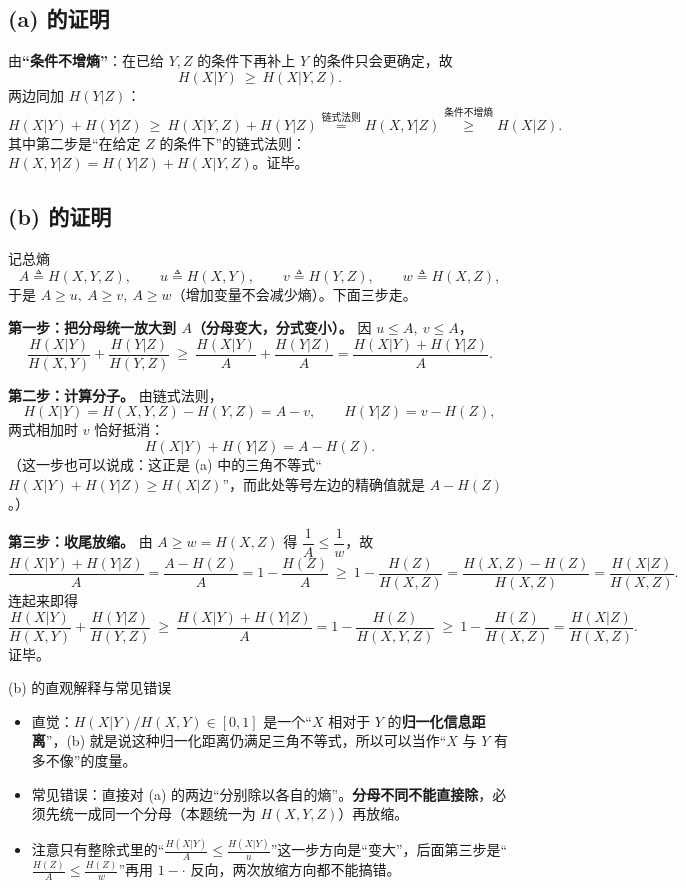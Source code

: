 \documentclass[11pt,a4paper]{ctexart}
\newcommand{\Hx}[1]{H\!\left(#1\right)}
\begin{document}
\subsection*{(a) 的证明}
由\textbf{“条件不增熵”}：在已给 $Y,Z$ 的条件下再补上 $Y$ 的条件只会更确定，故
\[
\Hx{X|Y}\ \ge\ \Hx{X|Y,Z}.
\]
两边同加 $\Hx{Y|Z}$：
\[
\Hx{X|Y}+\Hx{Y|Z}\ \ge\ \Hx{X|Y,Z}+\Hx{Y|Z}
\overset{\text{链式法则}}{=}\Hx{X,Y|Z}
\overset{\text{条件不增熵}}{\ge}\Hx{X|Z}.
\]
其中第二步是“在给定 $Z$ 的条件下”的链式法则：
$\Hx{X,Y|Z}=\Hx{Y|Z}+\Hx{X|Y,Z}$。证毕。

\subsection*{(b) 的证明}
记总熵
\[
A\triangleq \Hx{X,Y,Z},\qquad u\triangleq\Hx{X,Y},\qquad v\triangleq\Hx{Y,Z},\qquad w\triangleq\Hx{X,Z},
\]
于是 $A\ge u,\ A\ge v,\ A\ge w$（增加变量不会减少熵）。下面三步走。

\textbf{第一步：把分母统一放大到 $A$（分母变大，分式变小）。} 因 $u\le A,\ v\le A$，
\[
\frac{\Hx{X|Y}}{\Hx{X,Y}}+\frac{\Hx{Y|Z}}{\Hx{Y,Z}}
\ \ge\ \frac{\Hx{X|Y}}{A}+\frac{\Hx{Y|Z}}{A}
=\frac{\Hx{X|Y}+\Hx{Y|Z}}{A}.
\]

\textbf{第二步：计算分子。} 由链式法则，
\[
\Hx{X|Y}=\Hx{X,Y,Z}-\Hx{Y,Z}=A-v,\qquad
\Hx{Y|Z}=v-H(Z),
\]
两式相加时 $v$ 恰好抵消：
\[
\Hx{X|Y}+\Hx{Y|Z}=A-H(Z).
\]
（这一步也可以说成：这正是 (a) 中的三角不等式“$\Hx{X|Y}+\Hx{Y|Z}\ge \Hx{X|Z}$”，而此处等号左边的精确值就是 $A-H(Z)$。）

\textbf{第三步：收尾放缩。} 由 $A\ge w=\Hx{X,Z}$ 得 $\dfrac{1}{A}\le\dfrac{1}{w}$，故
\[
\frac{\Hx{X|Y}+\Hx{Y|Z}}{A}=\frac{A-H(Z)}{A}=1-\frac{H(Z)}{A}
\ \ge\ 1-\frac{H(Z)}{\Hx{X,Z}}
=\frac{\Hx{X,Z}-H(Z)}{\Hx{X,Z}}
=\frac{\Hx{X|Z}}{\Hx{X,Z}}.
\]
连起来即得
\[
\frac{\Hx{X|Y}}{\Hx{X,Y}}+\frac{\Hx{Y|Z}}{\Hx{Y,Z}}\ \ge\ 
\frac{\Hx{X|Y}+\Hx{Y|Z}}{A}=1-\frac{H(Z)}{\Hx{X,Y,Z}}\ \ge\ 1-\frac{H(Z)}{\Hx{X,Z}}=\frac{\Hx{X|Z}}{\Hx{X,Z}}.
\]
证毕。

\begin{keypoint}{(b) 的直观解释与常见错误}
\begin{itemize}[leftmargin=1.6em,itemsep=1pt,topsep=2pt]
  \item 直觉：$\Hx{X|Y}/\Hx{X,Y}\in[0,1]$ 是一个“$X$ 相对于 $Y$ 的\textbf{归一化信息距离}”，(b) 就是说这种归一化距离仍满足三角不等式，所以可以当作“$X$ 与 $Y$ 有多不像”的度量。
  \item 常见错误：直接对 (a) 的两边“分别除以各自的熵”。\textbf{分母不同不能直接除}，必须先统一成同一个分母（本题统一为 $\Hx{X,Y,Z}$）再放缩。
  \item 注意只有整除式里的“$\frac{\Hx{X|Y}}{A}\le\frac{\Hx{X|Y}}{u}$”这一步方向是“变大”，后面第三步是“$\frac{H(Z)}{A}\le\frac{H(Z)}{w}$”再用 $1-\cdot$ 反向，两次放缩方向都不能搞错。
\end{itemize}
\end{keypoint}
\end{document}
